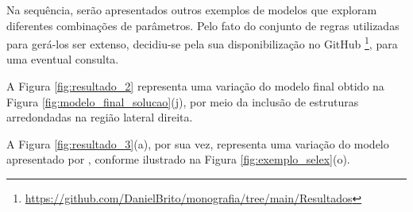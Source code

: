 

Na sequência, serão apresentados outros exemplos de modelos que exploram diferentes combinações de parâmetros. Pelo fato do conjunto de regras utilizadas para gerá-los ser extenso, decidiu-se pela sua disponibilização no GitHub \footnote{\href{https://github.com/DanielBrito/monografia/tree/main/Resultados}{https://github.com/DanielBrito/monografia/tree/main/Resultados}}, para uma eventual consulta.

A Figura \ref{fig:resultado_2} representa uma variação do modelo final obtido na Figura \ref{fig:modelo_final_solucao}(j), por meio da inclusão de estruturas arredondadas na região lateral direita.

\begin{figure}[h!]
	\centering
	\captionsetup{width=15cm}
	{}	
\end{figure}

A Figura \ref{fig:resultado_3}(a), por sua vez, representa uma variação do modelo apresentado por , conforme ilustrado na Figura \ref{fig:exemplo_selex}(o).

